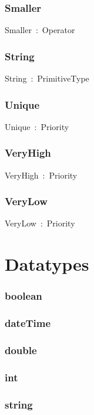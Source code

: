 \documentclass{article}
\begin{document}
\subsubsection*{Smaller}

Smaller~:~Operator

\subsubsection*{String}

String~:~PrimitiveType

\subsubsection*{Unique}

Unique~:~Priority

\subsubsection*{VeryHigh}

VeryHigh~:~Priority

\subsubsection*{VeryLow}

VeryLow~:~Priority

\section*{Datatypes}\subsubsection*{boolean}

\subsubsection*{dateTime}

\subsubsection*{double}

\subsubsection*{int}

\subsubsection*{string}
\end{document}
